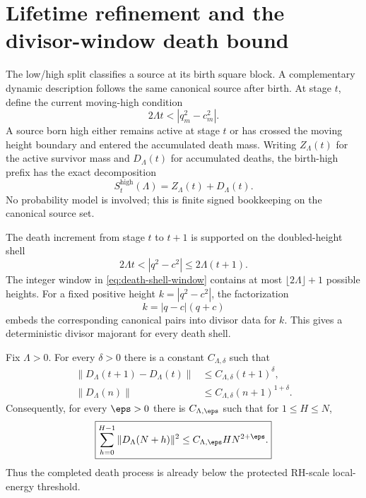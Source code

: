 \section{Lifetime refinement and the divisor-window death bound}
\label{sec:lifetime-death}

The low/high split classifies a source at its birth square block.  A complementary dynamic description follows the same canonical source after birth.  At stage $t$, define the current moving-high condition
\begin{equation}
 2\Lambda t<|q_m^2-c_m^2|.
 \label{eq:moving-high-condition}
\end{equation}
A source born high either remains active at stage $t$ or has crossed the moving height boundary and entered the accumulated death mass.  Writing $Z_\Lambda(t)$ for the active survivor mass and $D_\Lambda(t)$ for accumulated deaths, the birth-high prefix has the exact decomposition
\begin{equation}
 \boxed{S_t^{\mathrm{high}}(\Lambda)=Z_\Lambda(t)+D_\Lambda(t).}
 \label{eq:high-active-death}
\end{equation}
No probability model is involved; this is finite signed bookkeeping on the canonical source set.

The death increment from stage $t$ to $t+1$ is supported on the doubled-height shell
\begin{equation}
 2\Lambda t<|q^2-c^2|\le2\Lambda(t+1).
 \label{eq:death-shell-window}
\end{equation}
The integer window in \cref{eq:death-shell-window} contains at most $\lfloor2\Lambda\rfloor+1$ possible heights.  For a fixed positive height $k=|q^2-c^2|$, the factorization
\begin{equation}
 k=|q-c|(q+c)
 \label{eq:height-factorization}
\end{equation}
embeds the corresponding canonical pairs into divisor data for $k$.  This gives a deterministic divisor majorant for every death shell.

\begin{theorem}
\label{thm:death-subpolynomial}
Fix $\Lambda>0$.  For every $\delta>0$ there is a constant $C_{\Lambda,\delta}$ such that
\begin{align}
 \|D_\Lambda(t+1)-D_\Lambda(t)\|
 &\le C_{\Lambda,\delta}(t+1)^\delta,
 \label{eq:death-increment-subpoly}\\
 \|D_\Lambda(n)\|
 &\le C_{\Lambda,\delta}(n+1)^{1+\delta}.
 \label{eq:death-mass-subpoly}
\end{align}
Consequently, for every $\eps>0$ there is $C_{\Lambda,\eps}$ such that for $1\le H\le N$,
\begin{equation}
 \boxed{
 \sum_{h=0}^{H-1}\|D_\Lambda(N+h)\|^2
 \le C_{\Lambda,\eps}H N^{2+\eps}.
 }
 \label{eq:death-local-energy}
\end{equation}
Thus the completed death process is already below the protected RH-scale local-energy threshold.
\end{theorem}

